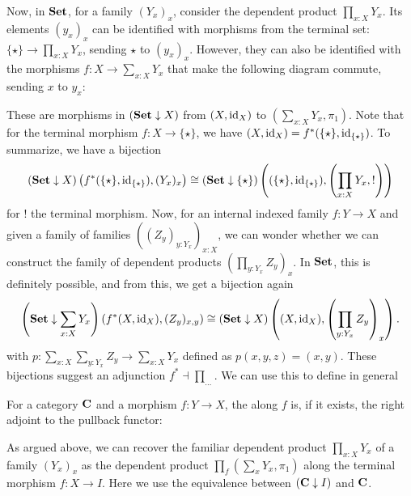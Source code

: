 Now, in $ \mathbf{Set} $, for a family $ (Y_x)_x $, consider the dependent product $ \prod_{x : X} Y_x $. Its elements $ (y_x)_x $ can be identified with morphisms from the terminal set: $ \{ \star \} \to \prod_{x : X} Y_x $, sending $ \star $ to $ (y_x)_x $. However, they can also be identified with the morphisms $ f: X \to \sum_{x : X} Y_x $ that make the following diagram commute, sending $ x $ to $ y_x $:
\begin{center}
\end{center}
These are morphisms in $ (\mathbf{Set} \downarrow X) $ from $ (X, \text{id}_{X}) $ to $ (\sum_{x : X} Y_x, \pi_1) $. Note that for the terminal morphism $ f: X \to \{ \star \} $, we have $ (X, \text{id}_{X}) = f^*(\{\star\}, \text{id}_{\{\star\}}) $. To summarize, we have a bijection
\[ (\mathbf{Set} \downarrow X)\left(f^*(\{ \star \}, \text{id}_{\{\star\}}), (Y_x)_x \right) \cong (\mathbf{Set} \downarrow {\{\star\}})\left( (\{\star\}, \text{id}_{\{ \star \}}), \left( \prod_{x : X} Y_x, ! \right) \right) \]
for $ ! $ the terminal morphism. Now, for an internal indexed family $ f : Y \to X $ and given a family of families $ ((Z_y)_{y : Y_x})_{x : X} $, we can wonder whether we can construct the family of dependent products $ (\prod_{y : Y_x} Z_y)_x $. In $ \mathbf{Set} $, this is definitely possible, and from this, we get a bijection again
\[ \left(\mathbf{Set} \downarrow \sum_{x : X} Y_x \right)\left(f^*(X, \text{id}_{X}), (Z_y)_{x, y} \right) \cong (\mathbf{Set} \downarrow X)\left((X, \text{id}_{X}), \left(\prod_{y : Y_x} Z_y\right)_x\right). \]
with $ p : \sum_{x : X} \sum_{y : Y_x} Z_y \to \sum_{x : X} Y_x $ defined as $ p(x, y, z) = (x, y) $. These bijections suggest an adjunction $ f^* \dashv \prod_{\dots} $. We can use this to define in general
\begin{definition}
  For a category $ \mathbf{C} $ and a morphism $ f: Y \to X $, the  along $ f $ is, if it exists, the right adjoint to the pullback functor:
  \begin{center}
  \end{center}
\end{definition}
\begin{remark}
  As argued above, we can recover the familiar dependent product $ \prod_{x : X} Y_x $ of a family $ (Y_x)_x $ as the dependent product $ \prod_f (\sum_x Y_x, \pi_1) $ along the terminal morphism $ f: X \to I $. Here we use the equivalence between $ (\mathbf{C} \downarrow I) $ and $ \mathbf{C} $.
\end{remark}

